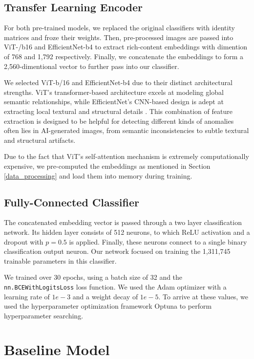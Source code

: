 \documentclass{article} %
\begin{document}
\subsection{Transfer Learning Encoder}
\label{encoder}

For both pre-trained models, we replaced the original classifiers with identity matrices and froze their weights. Then, pre-processed images are passed into ViT-/b16 and EfficientNet-b4 to extract rich-content embeddings with dimention of 768 and 1,792 respectively. Finally, we concatenate the embeddings to form a 2,560-dimentional vector to further pass into our classifier.

We selected ViT-b/16 and EfficientNet-b4 due to their distinct architectural strengths. ViT's transformer-based architecture excels at modeling global semantic relationships, while EfficientNet's CNN-based design is adept at extracting local textural and structural details \citep{Idrees_2024}. This combination of feature extraction is designed to be helpful for detecting different kinds of anomalies often lies in AI-generated images, from semantic inconsistencies to subtle textural and structural artifacts.

Due to the fact that ViT's self-attention mechanism is extremely computationally expensive, we pre-computed the embeddings as mentioned in Section \ref{data_processing} and load them into memory during training.

\subsection{Fully-Connected Classifier}

The concatenated embedding vector is passed through a two layer classification network. Its hidden layer consists of 512 neurons, to which ReLU activation and a dropout with $p=0.5$ is applied. Finally, these neurons connect to a single binary classification output neuron. Our network focused on training the 1,311,745 trainable parameters in this classifier.

We trained over 30 epochs, using a batch size of 32 and the \texttt{nn.BCEWithLogitsLoss} loss function. We used the Adam optimizer with a learning rate of $1e-3$ and a weight decay of $1e-5$. To arrive at these values, we used the hyperparameter optimization framework Optuna \citep{akiba2019optuna} to perform hyperparameter searching.

\section{Baseline Model}
\end{document}
